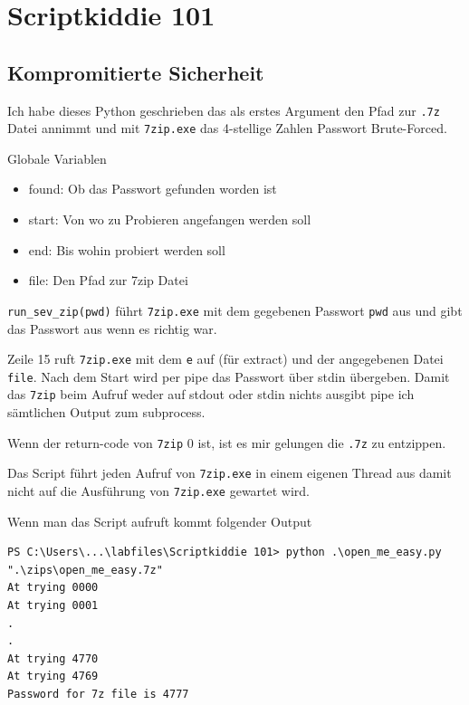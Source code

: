 \documentclass[12pt,a4paper,titlepage,oneside]{scrartcl}
\begin{document}
\pagebreak
\section{Scriptkiddie 101}

\subsection{Kompromitierte Sicherheit}



Ich habe dieses Python geschrieben das als erstes Argument den Pfad zur \lstinline{.7z} Datei annimmt und mit \lstinline{7zip.exe} das 4-stellige Zahlen Passwort Brute-Forced.

Globale Variablen
\begin{itemize}
    \item found: Ob das Passwort gefunden worden ist
    \item start: Von wo zu Probieren angefangen werden soll
    \item end: Bis wohin probiert werden soll
    \item file: Den Pfad zur 7zip Datei
\end{itemize}

\lstinline{run_sev_zip(pwd)} führt \lstinline{7zip.exe} mit dem gegebenen Passwort \lstinline{pwd} aus und gibt das Passwort aus wenn es richtig war.

Zeile 15 ruft \lstinline{7zip.exe} mit dem \lstinline{e} auf (für extract) und der angegebenen Datei \lstinline{file}. Nach dem Start wird per pipe das Passwort über stdin übergeben. Damit das \lstinline{7zip} beim Aufruf weder auf stdout oder stdin nichts ausgibt pipe ich sämtlichen Output zum subprocess.

Wenn der return-code von \lstinline{7zip} 0 ist, ist es mir gelungen die \lstinline{.7z} zu entzippen.

Das Script führt jeden Aufruf von \lstinline{7zip.exe} in einem eigenen Thread aus damit nicht auf die Ausführung von \lstinline{7zip.exe} gewartet wird.

Wenn man das Script aufruft kommt folgender Output
\begin{lstlisting}
PS C:\Users\...\labfiles\Scriptkiddie 101> python .\open_me_easy.py ".\zips\open_me_easy.7z"
At trying 0000
At trying 0001
.
.
At trying 4770
At trying 4769
Password for 7z file is 4777 
\end{lstlisting}
\end{document}
